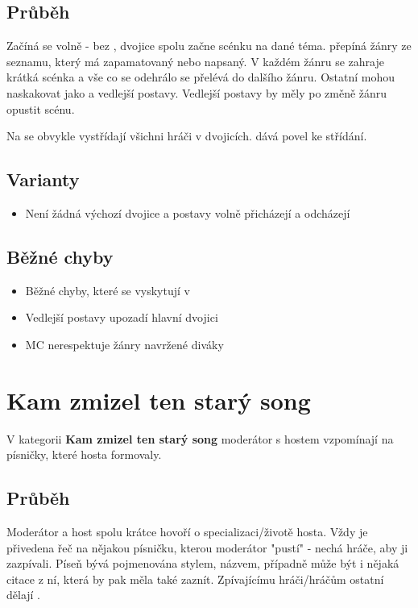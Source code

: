  
\subsection{Průběh} Začíná se volně - bez , dvojice spolu začne scénku na dané téma.  přepíná žánry ze seznamu, který má zapamatovaný nebo napsaný. V každém žánru se zahraje krátká scénka a vše co se odehrálo se přelévá do dalšího žánru. Ostatní  mohou naskakovat jako  a vedlejší postavy. Vedlejší postavy by měly po změně žánru opustit scénu.  
 
Na  se obvykle vystřídají všichni hráči v dvojicích.  dává povel ke střídání. 
 
\subsection{ Varianty } \begin{itemize}
\item Není žádná výchozí dvojice a postavy volně přicházejí a odcházejí
\end{itemize}
 
\subsection{ Běžné chyby } \begin{itemize}
\item Běžné chyby, které se vyskytují v 
\item Vedlejší postavy upozadí hlavní dvojici
\item MC nerespektuje žánry navržené diváky
\end{itemize}
 
 
 
 
 
\needspace{5cm} \section{Kam zmizel ten starý song} \label{kam zmizel ten starý song}  
 
 
V kategorii \textbf{Kam zmizel ten starý song}{} moderátor s hostem vzpomínají na písničky, které hosta formovaly. 
 
 
\subsection{Průběh} Moderátor a host spolu krátce hovoří o specializaci/životě hosta. 
Vždy je přivedena řeč na nějakou písničku, kterou moderátor "pustí"{} - nechá hráče, aby ji zazpívali. 
Píseň bývá pojmenována stylem, názvem, případně může být i nějaká citace z ní, která by pak měla také zaznít. 
Zpívajícímu hráči/hráčům ostatní dělají . 
 
